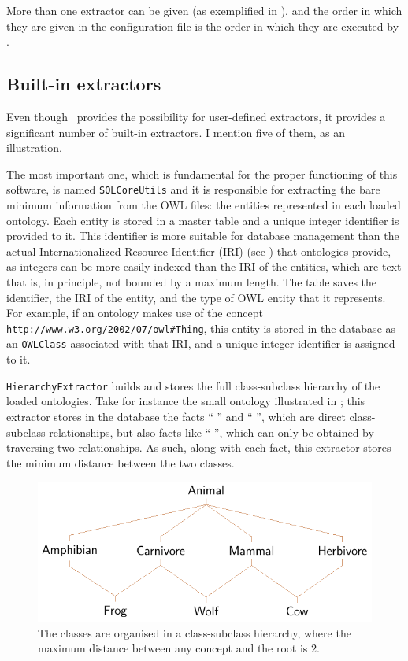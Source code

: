 More than one extractor can be given (as exemplified in ), and the order in which they are given in the configuration file is the order in which they are executed by \owlsql.


\subsection{Built-in extractors} \label{sub:owlsql/builtin}

Even though \owlsql\ provides the possibility for user-defined extractors, it provides a significant number of built-in extractors. I mention five of them, as an illustration.

The most important one, which is fundamental for the proper functioning of this software, is named \texttt{SQLCoreUtils} and it is responsible for extracting the bare minimum information from the OWL files: the entities represented in each loaded ontology. Each entity is stored in a master table and a unique integer identifier is provided to it. This identifier is more suitable for database management than the actual Internationalized Resource Identifier (IRI) (see ) that ontologies provide, as integers can be more easily indexed than the IRI of the entities, which are text that is, in principle, not bounded by a maximum length. The table saves the identifier, the IRI of the entity, and the type of OWL entity that it represents. For example, if an ontology makes use of the concept \nolinkurl{http://www.w3.org/2002/07/owl\#Thing}, this entity is stored in the database as an \texttt{OWLClass} associated with that IRI, and a unique integer identifier is assigned to it.

\texttt{HierarchyExtractor} builds and stores the full class-subclass hierarchy of the loaded ontologies. Take for instance the small ontology illustrated in ; this extractor stores in the database the facts ``  '' and ``  '', which are direct class-subclass relationships, but also facts like ``  '', which can only be obtained by traversing two relationships. As such, along with each fact, this extractor stores the minimum distance between the two classes.

\begin{figure}
    \centering
    \includegraphics{images/animal-ontology.pdf}
    \caption[A toy ontology representing some animals]{The classes are organised in a class-subclass hierarchy, where the maximum distance between any concept and the root is $2$.}
    \label{fig:small-ontology}
\end{figure}

